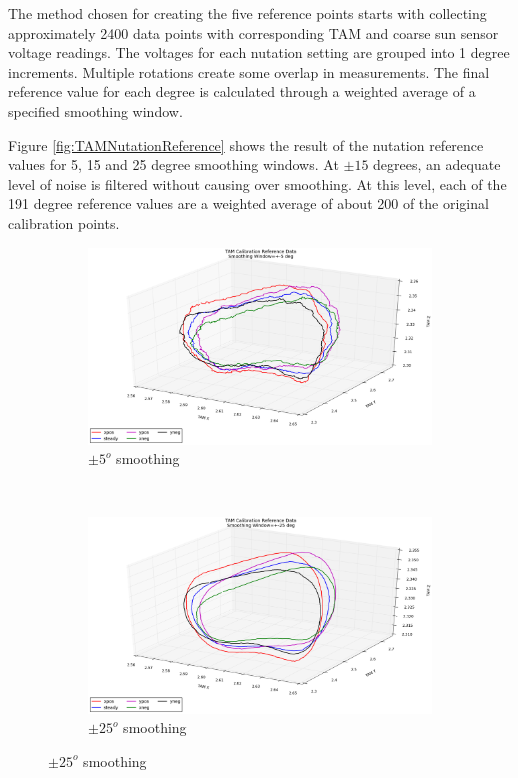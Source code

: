 The method chosen for creating the five reference points starts with collecting approximately 2400 data points with corresponding TAM and coarse sun sensor voltage readings.  The voltages for each nutation setting are grouped into 1 degree increments.  Multiple rotations create some overlap in measurements.  The final reference value for each degree is calculated through a weighted average of a specified smoothing window.

Figure \ref{fig:TAMNutationReference} shows the result of the nutation reference values for 5, 15 and 25 degree smoothing windows.  At $\pm 15$ degrees, an adequate level of noise is filtered without causing over smoothing.  At this level, each of the 191 degree reference values are a weighted average of about 200 of the original calibration points.

\begin{figure}[H]
  \begin{subfigure}[h!]{0.5\textwidth}
    \includegraphics[width=\textwidth]{figures/tam_calibration_ref_5deg_smoothing.eps}
    \caption{$\pm 5^o$ smoothing}
    \label{fig:TAM5degCalibration}
  \end{subfigure}
  ~
  \begin{subfigure}[h!]{0.5\textwidth}
    \includegraphics[width=\textwidth]{figures/tam_calibration_ref_25deg_smoothing.eps}
    \caption{$\pm 25^o$ smoothing}
    \label{fig:TAM25degCalibration}
  \end{subfigure}


\end{figure}
